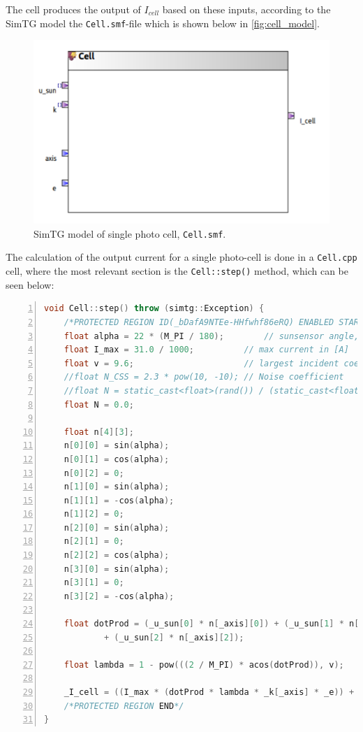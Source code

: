 The cell produces the output of $I_{cell}$ based on these inputs, according to the SimTG model the \texttt{Cell.smf}-file which is shown below in \autoref{fig:cell_model}.

\begin{figure}[H]
    \centering
    \includegraphics[width=0.7\linewidth]{doc//Graphics/cell_model.png}
    \caption{SimTG model of single photo cell, \texttt{Cell.smf}.}
    \label{fig:cell_model}
\end{figure}

The calculation of the output current for a single photo-cell is done in a \texttt{Cell.cpp} cell, where the most relevant section is the \texttt{Cell::step()} method, which can be seen below:
\begin{lstlisting}[frame=single, numbers=left, basicstyle=\tiny, language = C++]
void Cell::step() throw (simtg::Exception) {
	/*PROTECTED REGION ID(_bDafA9NTEe-HHfwhf86eRQ) ENABLED START*/
	float alpha = 22 * (M_PI / 180);		// sunsensor angle, converted to rad
	float I_max = 31.0 / 1000;			// max current in [A]
	float v = 9.6;						// largest incident coeff [-]
	//float N_CSS = 2.3 * pow(10, -10);	// Noise coefficient
	//float N = static_cast<float>(rand()) / (static_cast<float>(RAND_MAX / N_CSS)); // Noise
	float N = 0.0;

	float n[4][3];
	n[0][0] = sin(alpha);
	n[0][1] = cos(alpha);
	n[0][2] = 0;
	n[1][0] = sin(alpha);
	n[1][1] = -cos(alpha);
	n[1][2] = 0;
	n[2][0] = sin(alpha);
	n[2][1] = 0;
	n[2][2] = cos(alpha);
	n[3][0] = sin(alpha);
	n[3][1] = 0;
	n[3][2] = -cos(alpha);

	float dotProd = (_u_sun[0] * n[_axis][0]) + (_u_sun[1] * n[_axis][1])
			+ (_u_sun[2] * n[_axis][2]);

	float lambda = 1 - pow(((2 / M_PI) * acos(dotProd)), v);

	_I_cell = ((I_max * (dotProd * lambda * _k[_axis] * _e)) + N);
	/*PROTECTED REGION END*/
}
\end{lstlisting}








